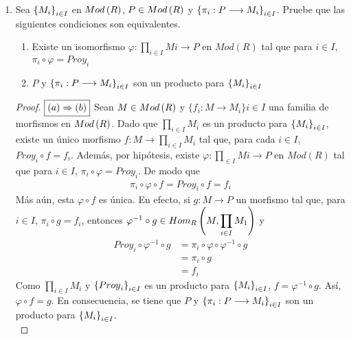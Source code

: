 \documentclass{article}
\begin{document}
\begin{enumerate}[label=\textbf{Ej \arabic*.}]
	\item Sea ${\left\{{M}_{i}\right\}}_{i\in I}$ en $Mod\left(R\right)$, $P \in Mod\left(R\right)$ y $\left\{\pi_{i}: P \longrightarrow M_{i}\right\}_{i \in I}$. Pruebe que las siguientes condiciones son equivalentes.
	\begin{enumerate}
		\item Existe un isomorfismo $\varphi : \displaystyle\prod_{i \in I} Mi \longrightarrow P$ en $Mod(R)$ tal que para $i \in I$, $\pi_{i}\circ\varphi = Proy_{i}$
		\item $P$ y $\left\{\pi_{i}: P \longrightarrow M_{i}\right\}_{i \in I}$ son un producto para ${\left\{{M}_{i}\right\}}_{i\in I}$
	\end{enumerate}
	\begin{proof}
		$\boxed{\left(a\right)\Rightarrow\left(b\right)}$ Sean $M \in Mod\left(R\right)$ y $\{f_{i}:M \longrightarrow M_{i}\}{i \in I}$ una familia de morfismos en $Mod\left(R\right)$. Dado que $\displaystyle\prod_{i \in I}M_{i}$ es un producto para ${\left\{{M}_{i}\right\}}_{i\in I}$, existe un único morfismo $f:M\longrightarrow\displaystyle\prod_{i \in I}M_{i}$ tal que, para cada $i \in I$, $Proy_{i} \circ f = f_{i}$. Además, por hipótesis, existe $\varphi : \displaystyle\prod_{\in I} Mi \longrightarrow P$ en $Mod(R)$ tal que para $i \in I$, $\pi_{i}\circ\varphi = Proy_{i}$. De modo que 
		\begin{align*}
			\pi_{i}\circ\varphi\circ f = Proy_{i} \circ f = f_{i}
		\end{align*}
		Más aún, esta $\varphi \circ f$ es única. En efecto, si $g:M \longrightarrow P$ un morfismo tal que, para $i \in I$, $\pi_{i}\circ g = f_{i}$, entonces $\varphi^{-1}\circ g \in Hom_{R}\left(M,\displaystyle\prod_{i \in I}M_{1}\right)$ y
		\begin{align*}
			Proy_{i}\circ\varphi^{-1}\circ g &= \pi_{i}\circ\varphi\circ\varphi^{-1}\circ g\\
			&= \pi_{i}\circ g\\
			&= f_{i}
		\end{align*}
		Como $\displaystyle\prod_{i \in I}M_{i}$ y ${\left\{{Proy}_{i}\right\}}_{i\in I}$ es un producto para ${\left\{{M}_{i}\right\}}_{i\in I}$, $f=\varphi^{-1}\circ g$. Así, $\varphi\circ f=g$. En consecuencia, se tiene que $P$ y $\left\{\pi_{i}: P \longrightarrow M_{i}\right\}_{i \in I}$ son un producto para ${\left\{{M}_{i}\right\}}_{i\in I}$.\\
		

\end{proof}
\end{enumerate}
\end{document}
